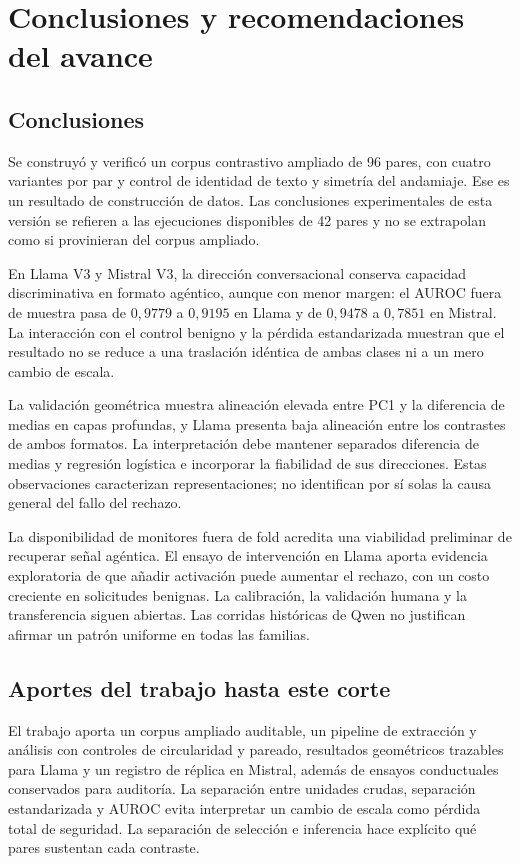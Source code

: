 \chapter{Conclusiones y recomendaciones del avance}
\label{chap:conclusiones}
\section{Conclusiones}

Se construyó y verificó un corpus contrastivo ampliado de 96 pares, con cuatro variantes por par y control de identidad de texto y simetría del andamiaje. Ese es un resultado de construcción de datos. Las conclusiones experimentales de esta versión se refieren a las ejecuciones disponibles de 42 pares y no se extrapolan como si provinieran del corpus ampliado.

En Llama V3 y Mistral V3, la dirección conversacional conserva capacidad discriminativa en formato agéntico, aunque con menor margen: el AUROC fuera de muestra pasa de $0{,}9779$ a $0{,}9195$ en Llama y de $0{,}9478$ a $0{,}7851$ en Mistral. La interacción con el control benigno y la pérdida estandarizada muestran que el resultado no se reduce a una traslación idéntica de ambas clases ni a un mero cambio de escala.

La validación geométrica muestra alineación elevada entre PC1 y la diferencia de medias en capas profundas, y Llama presenta baja alineación entre los contrastes de ambos formatos. La interpretación debe mantener separados diferencia de medias y regresión logística e incorporar la fiabilidad de sus direcciones. Estas observaciones caracterizan representaciones; no identifican por sí solas la causa general del fallo del rechazo.

La disponibilidad de monitores fuera de fold acredita una viabilidad preliminar de recuperar señal agéntica. El ensayo de intervención en Llama aporta evidencia exploratoria de que añadir activación puede aumentar el rechazo, con un costo creciente en solicitudes benignas. La calibración, la validación humana y la transferencia siguen abiertas. Las corridas históricas de Qwen no justifican afirmar un patrón uniforme en todas las familias.

\section{Aportes del trabajo hasta este corte}

El trabajo aporta un corpus ampliado auditable, un pipeline de extracción y análisis con controles de circularidad y pareado, resultados geométricos trazables para Llama y un registro de réplica en Mistral, además de ensayos conductuales conservados para auditoría. La separación entre unidades crudas, separación estandarizada y AUROC evita interpretar un cambio de escala como pérdida total de seguridad. La separación de selección e inferencia hace explícito qué pares sustentan cada contraste.

